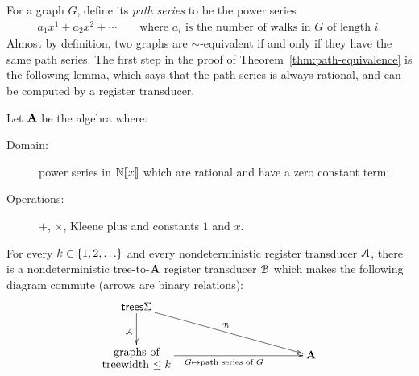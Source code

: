 For a graph $G$, define its \emph{path series} to be the power series 
\begin{align*}
  a_1 x^1 + a_2x^2 + \cdots \qquad \text{where $a_i$ is the number of walks in $G$ of length $i$.}
\end{align*}
Almost by definition, two graphs are $\sim$-equivalent if and only if they have the same path series. 
The first step in the proof of Theorem~\ref{thm:path-equivalence} is the following lemma, which says  that the path series is always  rational, and can be computed by a register transducer.
\begin{lemma}\label{lem:compute-power-series}    
    Let $\mathbf{A}$ be the algebra where:
    \begin{description}
        \item[Domain:]power series in $\mathbb N [\![x]\!]$ which are rational and have a  zero constant term;
        \item[Operations:] $+$, $\times$, Kleene plus and constants $1$ and $x$.
    \end{description}
    For every $k \in \{1,2,\ldots\}$ and every nondeterministic   register transducer ${\mathcal A}$, there is a nondeterministic tree-to-$\mathbf{A}$ register transducer ${\mathcal B}$ which makes the following diagram commute (arrows are binary relations):
    \begin{align*}
    \xymatrix@C=4cm{
        \trees \Sigma   
        \ar[dr]^{\Bb}
        \ar[d]_{\Aa} \\
        \txt{graphs of\\
        treewidth $\le k$} \ar[r]_{G \mapsto \text{path series of $G$}}& \aalg
    }
    \end{align*}
\end{lemma}
